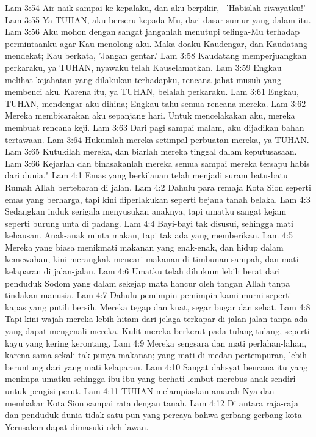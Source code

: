Lam 3:54  Air naik sampai ke kepalaku, dan aku berpikir, --'Habislah riwayatku!'
Lam 3:55  Ya TUHAN, aku berseru kepada-Mu, dari dasar sumur yang dalam itu.
Lam 3:56  Aku mohon dengan sangat janganlah menutupi telinga-Mu terhadap permintaanku agar Kau menolong aku. Maka doaku Kaudengar, dan Kaudatang mendekat; Kau berkata, 'Jangan gentar.'
Lam 3:58  Kaudatang memperjuangkan perkaraku, ya TUHAN, nyawaku telah Kauselamatkan.
Lam 3:59  Engkau melihat kejahatan yang dilakukan terhadapku, rencana jahat musuh yang membenci aku. Karena itu, ya TUHAN, belalah perkaraku.
Lam 3:61  Engkau, TUHAN, mendengar aku dihina; Engkau tahu semua rencana mereka.
Lam 3:62  Mereka membicarakan aku sepanjang hari. Untuk mencelakakan aku, mereka membuat rencana keji.
Lam 3:63  Dari pagi sampai malam, aku dijadikan bahan tertawaan.
Lam 3:64  Hukumlah mereka setimpal perbuatan mereka, ya TUHAN.
Lam 3:65  Kutukilah mereka, dan biarlah mereka tinggal dalam keputusasaan.
Lam 3:66  Kejarlah dan binasakanlah mereka semua sampai mereka tersapu habis dari dunia."
Lam 4:1  Emas yang berkilauan telah menjadi suram batu-batu Rumah Allah bertebaran di jalan.
Lam 4:2  Dahulu para remaja Kota Sion seperti emas yang berharga, tapi kini diperlakukan seperti bejana tanah belaka.
Lam 4:3  Sedangkan induk serigala menyusukan anaknya, tapi umatku sangat kejam seperti burung unta di padang.
Lam 4:4  Bayi-bayi tak disusui, sehingga mati kehausan. Anak-anak minta makan, tapi tak ada yang memberikan.
Lam 4:5  Mereka yang biasa menikmati makanan yang enak-enak, dan hidup dalam kemewahan, kini merangkak mencari makanan di timbunan sampah, dan mati kelaparan di jalan-jalan.
Lam 4:6  Umatku telah dihukum lebih berat dari penduduk Sodom yang dalam sekejap mata hancur oleh tangan Allah tanpa tindakan manusia.
Lam 4:7  Dahulu pemimpin-pemimpin kami murni seperti kapas yang putih bersih. Mereka tegap dan kuat, segar bugar dan sehat.
Lam 4:8  Tapi kini wajah mereka lebih hitam dari jelaga terkapar di jalan-jalan tanpa ada yang dapat mengenali mereka. Kulit mereka berkerut pada tulang-tulang, seperti kayu yang kering kerontang.
Lam 4:9  Mereka sengsara dan mati perlahan-lahan, karena sama sekali tak punya makanan; yang mati di medan pertempuran, lebih beruntung dari yang mati kelaparan.
Lam 4:10  Sangat dahsyat bencana itu yang menimpa umatku sehingga ibu-ibu yang berhati lembut merebus anak sendiri untuk pengisi perut.
Lam 4:11  TUHAN melampiaskan amarah-Nya dan membakar Kota Sion sampai rata dengan tanah.
Lam 4:12  Di antara raja-raja dan penduduk dunia tidak satu pun yang percaya bahwa gerbang-gerbang kota Yerusalem dapat dimasuki oleh lawan.
